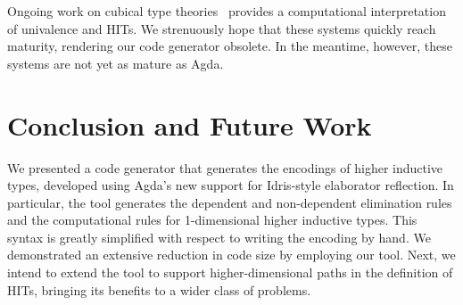 \documentclass[runningheads]{llncs}
\begin{document}
Ongoing work on cubical type theories~\cite{cohen}\cite{Angiuli-2017}\cite{cubicalHIT} provides a computational interpretation of univalence and HITs.
We strenuously hope that these systems quickly reach maturity, rendering our code generator obsolete.
In the meantime, however, these systems are not yet as mature as Agda.

\section{Conclusion and Future Work}

We presented a code generator that generates the encodings of higher inductive types, developed using Agda's new support for Idris-style elaborator reflection.
In particular, the tool generates the dependent and non-dependent elimination rules and the computational rules for 1-dimensional higher inductive types.
This syntax is greatly simplified with respect to writing the encoding by hand.
We demonstrated an extensive reduction in code size by employing our tool. Next, we intend to extend the tool to support higher-dimensional paths in the definition of HITs, bringing its benefits to a wider class of problems.
\end{document}
